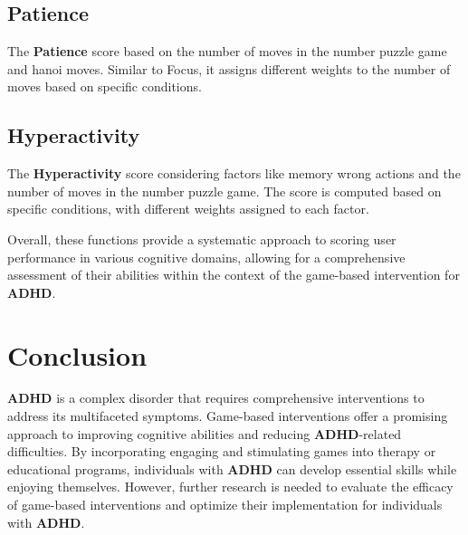 \documentclass{article}
\begin{document}
\subsection{Patience}
The \textbf{Patience} score based on the number of moves in the number puzzle game and hanoi moves. Similar to Focus, it assigns different weights to the number of moves based on specific conditions.

\subsection{Hyperactivity}
The \textbf{Hyperactivity} score considering factors like memory wrong actions and the number of moves in the number puzzle game. The score is computed based on specific conditions, with different weights assigned to each factor.

Overall, these functions provide a systematic approach to scoring user performance in various cognitive domains, allowing for a comprehensive assessment of their abilities within the context of the game-based intervention for \textbf{ADHD}.

\section{Conclusion}
\textbf{ADHD} is a complex disorder that requires comprehensive interventions to address its multifaceted symptoms. Game-based interventions offer a promising approach to improving cognitive abilities and reducing \textbf{ADHD}-related difficulties. By incorporating engaging and stimulating games into therapy or educational programs, individuals with \textbf{ADHD} can develop essential skills while enjoying themselves. However, further research is needed to evaluate the efficacy of game-based interventions and optimize their implementation for individuals with \textbf{ADHD}.
\end{document}
